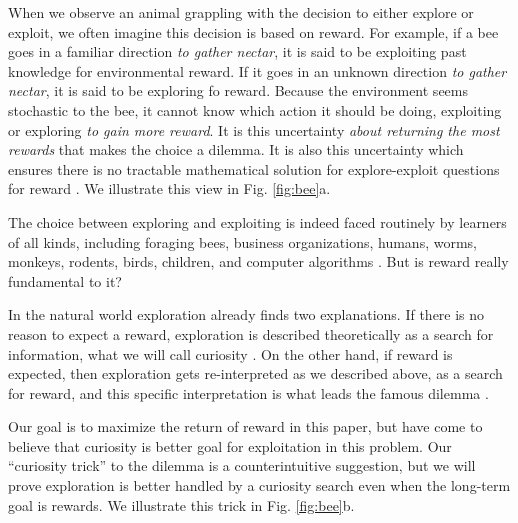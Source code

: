 When we observe an animal grappling with the decision to either explore or exploit, we often imagine this decision is based on reward. For example, if a bee goes in a familiar direction \textit{to gather nectar}, it is said to be exploiting past knowledge for environmental reward. If it goes in an unknown direction \textit{to gather nectar}, it is said to be exploring fo reward. Because the environment seems stochastic to the bee, it cannot know which action it should be doing, exploiting or exploring \textit{to gain more reward}. It is this uncertainty \textit{about returning the most rewards} that makes the choice a dilemma. It is also this uncertainty which ensures there is no tractable mathematical solution for explore-exploit questions for reward \citep{Thrun1992a,Dayan1996,Ishii2002,Simsek2006,Gershman2018b}. We illustrate this view in Fig. \ref{fig:bee}a.

The choice between exploring and exploiting is indeed faced routinely by learners of all kinds, including foraging bees, business organizations, humans, worms, monkeys, rodents, birds, children, and computer algorithms \citep{Gupta2006,Sutton2018,Woodgate2017,Lee2011a,Schulz2018a,Calhoun2014,Wang2019,Sumner2019,Auersperg2015}. But is reward really fundamental to it?

In the natural world exploration already finds two explanations. If there is no reason to expect a reward, exploration is described theoretically as a search for information, what we will call curiosity \citep{Berlyne1950,Schmidhuber1991,Kidd2015,deAbril2018,Jaegle2019,Friston2016}. On the other hand, if reward is expected, then exploration gets re-interpreted as we described above, as a search for reward, and this specific interpretation is what leads the famous dilemma \citep{Kelly1956,Berger-Tal2014,Dayan1996,Thrun1992,Mehlhorn2015,Kobayashi2019}. 

Our goal is to maximize the return of reward in this paper, but have come to believe that curiosity is better goal for exploitation in this problem. Our ``curiosity trick'' to the dilemma is a counterintuitive suggestion, but we will prove exploration is better handled by a curiosity search even when the long-term goal is rewards. We illustrate this trick in Fig. \ref{fig:bee}b.

